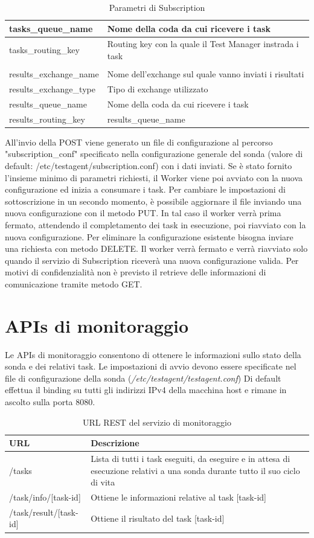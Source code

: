 \documentclass[../main.tex]{subfiles}
\begin{document}
\begin{table}[h]
\begin{tabular}{| m{4.4cm}| m{9cm} | }
tasks\_queue\_name & Nome della coda da cui ricevere i task \\ \hline
tasks\_routing\_key & Routing key con la quale il Test Manager instrada i task \\ \hline
 &  \\ \hline
results\_exchange\_name & Nome dell'exchange sul quale vanno inviati i risultati \\ \hline
results\_exchange\_type & Tipo di exchange utilizzato \\ \hline
results\_queue\_name & Nome della coda da cui ricevere i task \\ \hline
results\_routing\_key & results\_queue\_name \\ \hline
\end{tabular}
\caption{Parametri di Subscription}
\label{tab:subscription_parameters}
\end{table}
All'invio della POST viene generato un file di configurazione al percorso "subscription\_conf" specificato nella configurazione generale del sonda (valore di default: /etc/testagent/subscription.conf) con i dati inviati.
Se è stato fornito l'insieme minimo di parametri richiesti, il Worker viene poi avviato con la nuova configurazione ed inizia a consumare i task.
Per cambiare le impostazioni di sottoscrizione in un secondo momento, è possibile aggiornare il file inviando una nuova configurazione con il metodo PUT.
In tal caso il worker verrà prima fermato, attendendo il completamento dei task in esecuzione, poi riavviato con la nuova configurazione.
Per eliminare la configurazione esistente bisogna inviare una richiesta con metodo DELETE.
Il worker verrà fermato e verrà riavviato solo quando il servizio di Subscription riceverà una nuova configurazione valida.
Per motivi di confidenzialità non è previsto il retrieve delle informazioni di comunicazione tramite metodo GET.
\section{APIs di monitoraggio}
Le APIs di monitoraggio consentono di ottenere le informazioni sullo stato della sonda e dei relativi task.
Le impostazioni di avvio devono essere specificate nel file di configurazione della sonda (\textit{/etc/testagent/testagent.conf})
Di default effettua il binding su tutti gli indirizzi IPv4 della macchina host e rimane in ascolto sulla porta 8080.
\begin{table}[h]
\centering
\begin{tabular}{| m{4.4cm}| m{9cm} | }
\hline
\textbf{URL} & \textbf{Descrizione} \\ \hline
/tasks & Lista di tutti i task eseguiti, da eseguire e in attesa di esecuzione relativi a una sonda durante tutto il suo ciclo di vita \\ \hline 
/task/info/[task-id] & Ottiene le informazioni relative al task [task-id]\\ \hline
/task/result/[task-id] & Ottiene il risultato del task [task-id]\\ \hline
\end{tabular}
\caption{URL REST del servizio di monitoraggio}
\label{tab:monitoring urls}
\end{table}
\end{document}
